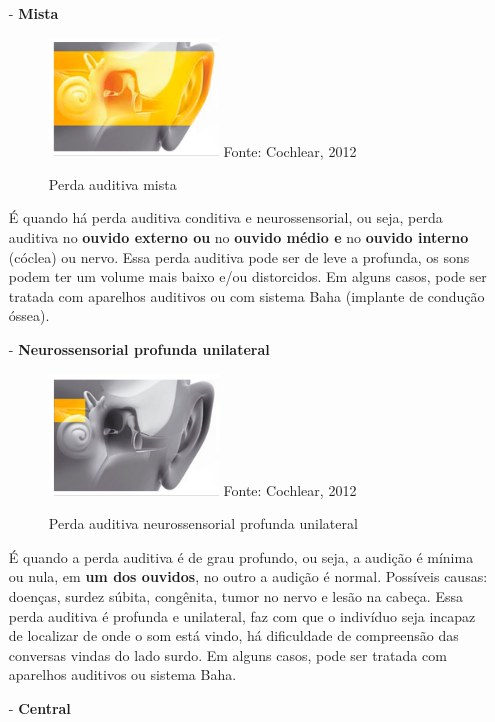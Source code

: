 \documentclass[brasil]{abnt}
\begin{document}
\begin{itemize}
					\item [-] \textbf{Mista} 
						\begin{figure}[!htb]
							\caption{Perda auditiva mista}
							\center
							\includegraphics[width=45mm]{pam.png}
							\center Fonte: Cochlear, 2012
						\end{figure}
						
						É quando há perda auditiva conditiva e neurossensorial, ou seja, perda auditiva no \textbf{ouvido externo ou} no \textbf{ouvido médio e} no \textbf{ouvido interno} (cóclea) ou nervo. Essa perda auditiva pode ser de leve a profunda, 
						os sons podem ter um volume mais baixo e/ou distorcidos. Em alguns casos, pode ser tratada com aparelhos auditivos ou com sistema Baha (implante de condução óssea).
					
					\item [-] \textbf{Neurossensorial profunda unilateral} 
						\begin{figure}[!htb]
							\caption{Perda auditiva neurossensorial profunda unilateral}
							\center
							\includegraphics[width=45mm]{panp.png}
							\center Fonte: Cochlear, 2012
						\end{figure}
						
						É quando a perda auditiva é de grau profundo, ou seja, a audição é mínima ou nula, em \textbf{um dos ouvidos}, no outro a audição é normal. Possíveis causas: doenças, surdez súbita, congênita, tumor no nervo e lesão na cabeça.
						Essa perda auditiva é profunda e unilateral, faz com que o indivíduo seja incapaz de localizar de onde o som está vindo, há dificuldade de compreensão das conversas vindas do lado surdo. Em alguns casos, pode ser
						tratada com aparelhos auditivos ou sistema Baha.
						
					\item [-] \textbf{Central} 
											

\end{itemize}
\end{document}
